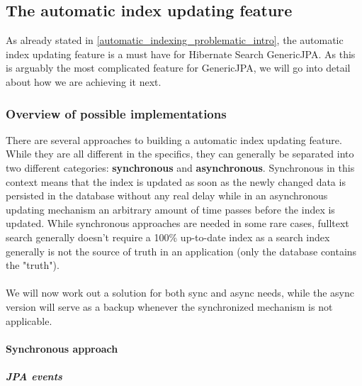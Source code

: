 \subsection{The automatic index updating feature}

As already stated in \ref{automatic_indexing_problematic_intro}, the automatic index updating feature is a must have for Hibernate Search GenericJPA. As this is arguably the most complicated feature for GenericJPA, we will go into detail about how we are achieving it next.

\subsubsection{Overview of possible implementations}

There are several approaches to building a automatic index updating feature. While they are all different in the specifics, they can generally be separated into two different categories: \textbf{synchronous} and \textbf{asynchronous}. Synchronous in this context means that the index is updated as soon as the newly changed data is persisted in the database without any real delay while in an asynchronous updating mechanism an arbitrary amount of time passes before the index is updated. While synchronous approaches are needed in some rare cases, fulltext search generally doesn't require a 100\% up-to-date index as a search index generally is not the source of truth in an application (only the database contains the "truth").
\\\\
We will now work out a solution for both sync and async needs, while the async version will serve as a backup whenever the synchronized mechanism is not applicable.

\paragraph{Synchronous approach}

\subparagraph{JPA events}

